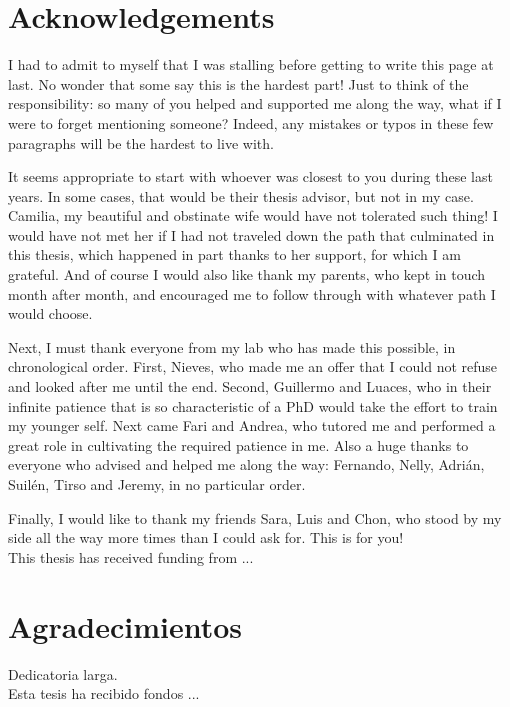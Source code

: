 \chapter*{Acknowledgements}
I had to admit to myself that I was stalling before getting to write this page at last. No wonder that some say this is the hardest part! Just to think of the responsibility: so many of you helped and supported me along the way, what if I were to forget mentioning someone? Indeed, any mistakes or typos in these few paragraphs will be the hardest to live with.

It seems appropriate to start with whoever was closest to you during these last years. In some cases, that would be their thesis advisor, but not in my case. Camilia, my beautiful and obstinate wife would have not tolerated such thing! I would have not met her if I had not traveled down the path that culminated in this thesis, which happened in part thanks to her support, for which I am grateful. And of course I would also like thank my parents, who kept in touch month after month, and encouraged me to follow through with whatever path I would choose.

Next, I must thank everyone from my lab who has made this possible, in chronological order. First, Nieves, who made me an offer that I could not refuse and looked after me until the end. Second, Guillermo and Luaces, who in their infinite patience that is so characteristic of a PhD would take the effort to train my younger self. Next came Fari and Andrea, who tutored me and performed a great role in cultivating the required patience in me. Also a huge thanks to everyone who advised and helped me along the way: Fernando, Nelly, Adri\'an, Suil\'en, Tirso and Jeremy, in no particular order.

Finally, I would like to thank my friends Sara, Luis and Chon, who stood by my side all the way more times than I could ask for. This is for you!\\

\vspace*{\fill}
This thesis has received funding from ...

\chapter*{Agradecimientos}
Dedicatoria larga.\\

\vspace*{\fill}
Esta tesis ha recibido fondos ...
